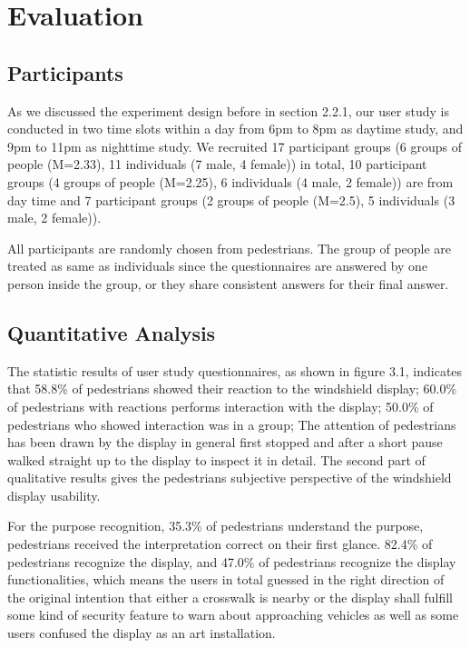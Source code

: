 \section{Evaluation}
\subsection{Participants}

As we discussed the experiment design before in section 2.2.1, our user study is conducted in two time slots within a day from 6pm to 8pm as daytime study, and 9pm to 11pm as nighttime study. We recruited 17 participant groups (6 groups of people (M=2.33), 11 individuals (7 male, 4 female)) in total, 10 participant groups (4 groups of people (M=2.25), 6 individuals (4 male, 2 female)) are from day time and 7 participant groups (2 groups of people (M=2.5), 5 individuals (3 male, 2 female)).

All participants are randomly chosen from pedestrians. The group of people are treated as same as individuals since the questionnaires are answered by one person inside the group, or they share consistent answers for their final answer.


\subsection{Quantitative Analysis}

The statistic results of user study questionnaires, as shown in figure 3.1, indicates that 58.8\% of pedestrians showed their reaction to the windshield display; 60.0\% of pedestrians with reactions performs interaction with the display; 50.0\% of pedestrians who showed interaction was in a group; The attention of pedestrians has been drawn by the display in general first stopped and after a short pause walked straight up to the display to
inspect it in detail. The second part of qualitative results gives the pedestrians subjective perspective of the windshield display usability.

For the purpose recognition, 35.3\% of pedestrians understand the purpose, pedestrians received the interpretation correct on their first glance. 82.4\% of pedestrians recognize the display, and 47.0\% of pedestrians recognize the display functionalities, which means the users in total guessed in the right direction of the original intention that either a crosswalk is nearby or the display shall fulfill some kind of security feature to warn about approaching vehicles as well as some users confused the display as an art installation.



